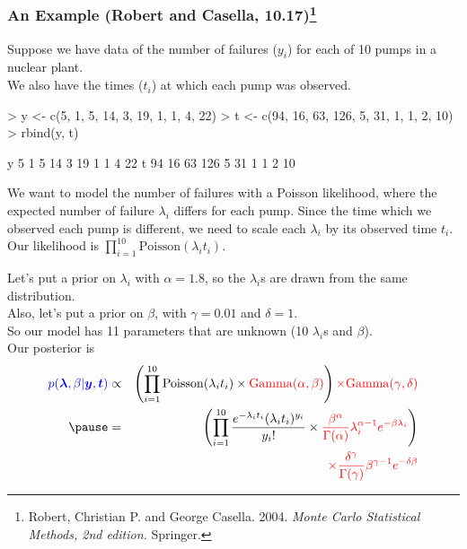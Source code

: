 \documentclass[handout]{beamer}
\begin{document}
\begin{frame}[fragile]
\frametitle{An Example (Robert and Casella, 10.17)\footnote{\tiny
{Robert, Christian P. and George Casella.  2004.  \textit{Monte Carlo
Statistical Methods, 2nd edition.}  Springer.}}}
\pause
\normalsize
Suppose we have data of the number of failures ($y_i$) for each of 10 pumps in
a nuclear plant. \\
\pause
\bigskip 
We also have the times ($t_i$) at which each pump was observed.
\medskip
\pause
\tiny
\begin{Schunk}
\begin{Sinput}
> y <- c(5, 1, 5, 14, 3, 19, 1, 1, 4, 22)
> t <- c(94, 16, 63, 126, 5, 31, 1, 1, 2, 10)
> rbind(y, t)
\end{Sinput}
\begin{Soutput}
  [,1] [,2] [,3] [,4] [,5] [,6] [,7] [,8] [,9] [,10]
y    5    1    5   14    3   19    1    1    4    22
t   94   16   63  126    5   31    1    1    2    10
\end{Soutput}
\end{Schunk}
\normalsize
\medskip
\pause
We want to model the number of failures with a Poisson likelihood,
where the expected number of failure $\lambda_i$ differs for each
pump.  \pause  Since the time which we observed each pump is
different, we need to scale each $\lambda_i$ by its observed time $t_i$.\\
\pause
\bigskip
Our likelihood is $\prod_{i=1}^{10} \mathrm{Poisson}(\lambda_i t_i)$.
\end{frame}

\begin{frame}
Let's put a  prior on $\lambda_i$ with
$\alpha = 1.8$, so the $\lambda_i$s are drawn from the same distribution.  \\
\pause
\bigskip
Also, let's put a  prior on $\beta$, with
$\gamma = 0.01$ and $\delta = 1$.\\
\pause
\bigskip 
So our model has 11 parameters that are unknown (10 $\lambda_i$s and $\beta$).\\
\pause
\bigskip
Our posterior is 
\begin{eqnarray*}
\blue{p(\bm{\lambda}, \beta | \bm{y}, \bm{t})} &\propto& \left( \prod_{i=1}^{10} \mathrm{Poisson}(\lambda_i
t_i) \times  \red{\mathrm{Gamma}(\alpha, \beta)} \right) \red{\times
\mathrm{Gamma}(\gamma, \delta)} \\
\pause
&=& \left( \prod_{i=1}^{10} \frac{e^{-\lambda_i t_i} (\lambda_i
t_i)^{y_i}}{y_i !} \times \red{\frac{\beta^{\alpha}}{\Gamma (\alpha)}
\lambda_i^{\alpha-1} e^{-\beta \lambda_i}} \right) \\
&\phantom{=}& \red{\times \frac{\delta^{\gamma}}{\Gamma (\gamma)}
\beta^{\gamma-1} e^{-\delta \beta} }
\end{eqnarray*}
\end{frame}
\end{document}
